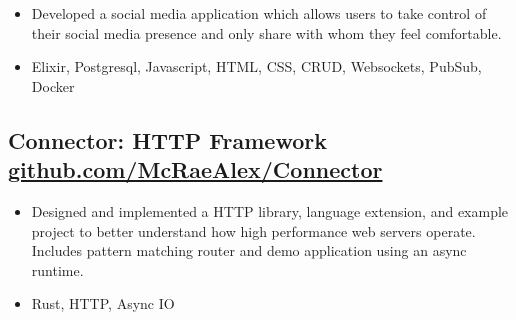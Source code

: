 \documentclass{article}
\begin{document}
\begin{itemize}
    \item Developed a social media application which allows users to take control of their social media presence and only share with whom they feel comfortable.
    \item Elixir, Postgresql, Javascript, HTML, CSS, CRUD, Websockets, PubSub, Docker
\end{itemize}

\subsection{Connector: HTTP Framework \href{https://github.com/McRaeAlex/connector}{github.com/McRaeAlex/Connector}}

\begin{itemize}
    \item Designed and implemented a HTTP library, language extension, and example project to better understand how high performance web servers operate. Includes pattern matching router and demo application using an async runtime.
    \item Rust, HTTP, Async IO
\end{itemize}
\end{document}
